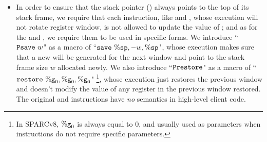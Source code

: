 \begin{itemize}
    \item
    In order to ensure that 
    the stack pointer (\spreg{}) always 
    points to the top of its stack frame, we require that   
    each instruction, like \cadd{} and \ld{}, whose 
    execution will not rotate register window, 
    is not allowed to update the value of \spreg{}; 
    and as for the \csave{} and \crestore{}, 
    we require them 
    to be used in specific forms. 
    We introduce ``$\Psave \ \word$" as a macro of 
    ``$\csave{} \ \spreg, -\word, \spreg$", 
    whose execution makes sure that a new \spreg{} 
    will be generated for the next window
    and point to the stack frame size $w$ allocated newly. 
    We also introduce ``$\texttt{Prestore}$" 
    as a macro of ``$\texttt{restore}{} \ \%\texttt{g}_{0}, \%\texttt{g}_{0}, \%\texttt{g}_{0}$"
    \footnote{In SPARCv8, $\%\texttt{g}_{0}$ is always equal to 0, 
    and usually used as parameters when instructions do not 
    require specific parameters.},  
    whose execution just restores the previous window 
    and doesn't modify the value of any register 
    in the previous window restored. 
    The original \csave{} and \crestore{} instructions 
    have \textit{no} semantics in high-level client code.   
    


\end{itemize}
